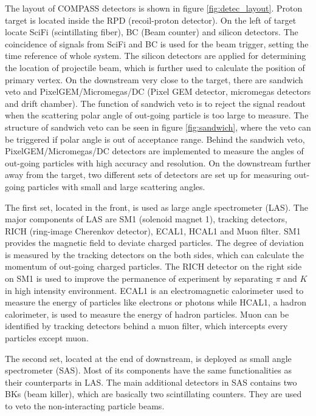The layout of COMPASS detectors is shown in figure \ref{fig:detec_layout}. Proton target is located inside the RPD (recoil-proton detector). On the left of target locate SciFi (scintillating fiber), BC (Beam counter) and silicon detectors. The coincidence of signals from SciFi and BC is used for the beam trigger, setting the time reference of whole system. The silicon detectors are applied for determining the location of projectile beam, which is further used to calculate the position of primary vertex. On the downstream very close to the target, there are sandwich veto and PixelGEM/Micromegas/DC (Pixel GEM detector, micromegas detectors and drift chamber). The function of sandwich veto is to reject the signal readout when the scattering polar angle of out-going particle is too large to measure. The structure of sandwich veto can be seen in figure \ref{fig:sandwich}, where the veto can be triggered if polar angle is out of acceptance range. Behind the sandwich veto, PixelGEM/Micromegas/DC detectors are implemented to measure the angles of out-going particles with high accuracy and resolution. On the downstream further away from the target, two different sets of detectors are set up for measuring out-going particles with small and large scattering angles. 

The first set, located in the front, is used as large angle spectrometer (LAS). The major components of LAS are SM1 (solenoid magnet 1), tracking detectors, RICH (ring-image Cherenkov detector), ECAL1, HCAL1 and Muon filter. SM1 provides the magnetic field to deviate charged particles. The degree of deviation is measured by the tracking detectors on the both sides, which can calculate the momentum of out-going charged particles. The RICH detector on the right side on SM1 is used to improve the permanence of experiment by separating $\pi$ and $K$ in high intensity environment\cite{RICH}. ECAL1 is an electromagnetic calorimeter used to measure the energy of particles like electrons or photons while HCAL1, a hadron calorimeter, is used to measure the energy of hadron particles. Muon can be identified by tracking detectors behind a muon filter, which intercepts every particles except muon.

The second set, located at the end of downstream, is deployed as small angle spectrometer (SAS). Most of its components have the same functionalities as their counterparts in LAS. The main additional detectors in SAS contains two BKs (beam killer), which are basically two scintillating counters. They are used to veto the non-interacting particle beams\cite{sandwich}.





